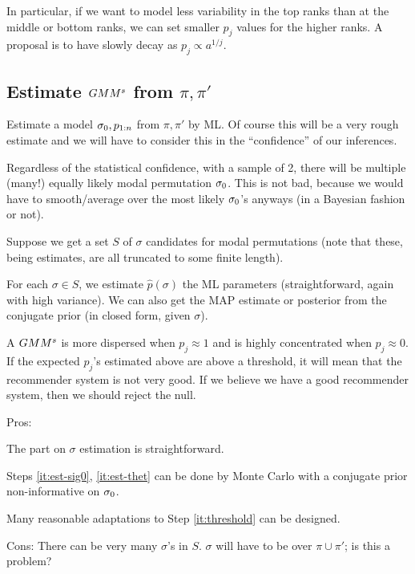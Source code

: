 \documentclass[10pt]{article}
\begin{document}
In particular, if we want to model less variability in the top ranks than at the middle or bottom ranks, we can set smaller $p_j$ values for the higher ranks. A proposal is to have slowly decay as $p_j\propto a^{1/j}$. %

\subsection{Estimate $GMM^s$ from $\pi,\pi'$}
\label{sec:gmm-sig0}
\benum
\item \label{it:est-sig0}  Estimate a model $\sigma_0,p_{1:n}$ from $\pi,\pi'$ by ML. Of course this will be a very rough estimate and we will have to consider this in the ``confidence'' of our inferences.

  Regardless of the statistical confidence, with a sample of 2, there will be multiple (many!) equally likely modal permutation $\sigma_0$. This is not bad, because we would have to smooth/average over the most likely $\sigma_0$'s anyways (in a Bayesian fashion or not).

Suppose we get a set $S$ of $\sigma$ candidates for modal permutations (note that these, being estimates, are all truncated to some finite length).

\item \label{it:est-thet} For each $\sigma\in S$, we estimate $\hat{p}(\sigma)$ the ML parameters (straightforward, again with high variance). We can also get the MAP estimate or posterior from the conjugate prior (in closed form, given $\sigma$).

\item \label{it:threshold} A $GMM^s$ is more dispersed when $p_j\approx 1$ and is highly concentrated when $p_j\approx 0$. If the expected $p_j$'s estimated above are above a threshold, it will mean that the recommender system is not very good. If we believe we have a good recommender system, then we should reject the null.  
\eenum

Pros:
\bit
\item The part on $\sigma$ estimation is straightforward.
  \item Steps \ref{it:est-sig0}, \ref{it:est-thet} can be done by
  Monte Carlo \cite{ChenM} with a conjugate prior
  non-informative on $\sigma_0$. %
\item Many   reasonable adaptations to Step \ref{it:threshold} can be
  designed.
  \eit
  
Cons: There can be very many $\sigma$'s in $S$. $\sigma$ will have to be over $\pi\cup \pi'$; is this a problem?
\end{document}
